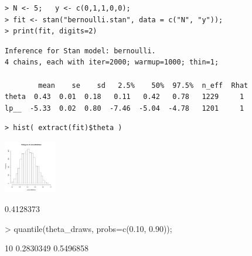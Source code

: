 \documentclass[10pt]{report}
\begin{document}
%
\begin{minipage}[t]{\textwidth}
\footnotesize
\begin{Verbatim}
> N <- 5;   y <- c(0,1,1,0,0);
> fit <- stan("bernoulli.stan", data = c("N", "y"));
> print(fit, digits=2)
\end{Verbatim}
%
\vspace*{1pt}
%
\begin{Verbatim}[fontshape=sl]
Inference for Stan model: bernoulli.
4 chains, each with iter=2000; warmup=1000; thin=1;

        mean    se    sd   2.5%    50%  97.5%  n_eff  Rhat
theta  0.43  0.01  0.18   0.11   0.42   0.78   1229     1
lp__  -5.33  0.02  0.80  -7.46  -5.04  -4.78   1201     1
\end{Verbatim}
%
\vspace*{3pt}
%
\begin{Verbatim}
> hist( extract(fit)$theta )
\end{Verbatim}
\vspace*{-24pt}
\hfill\includegraphics[height=0.9in]{img/bernoulli-posterior-histo.pdf}
\hspace*{24pt}
\end{minipage}


%
\begin{codeout}
[1] 0.4128373
\end{codeout}
%
\begin{codein}
> quantile(theta_draws, probs=c(0.10, 0.90));
\end{codein}
\begin{codeout}
      10%
0.2830349 0.5496858
\end{codeout}
\end{document}
